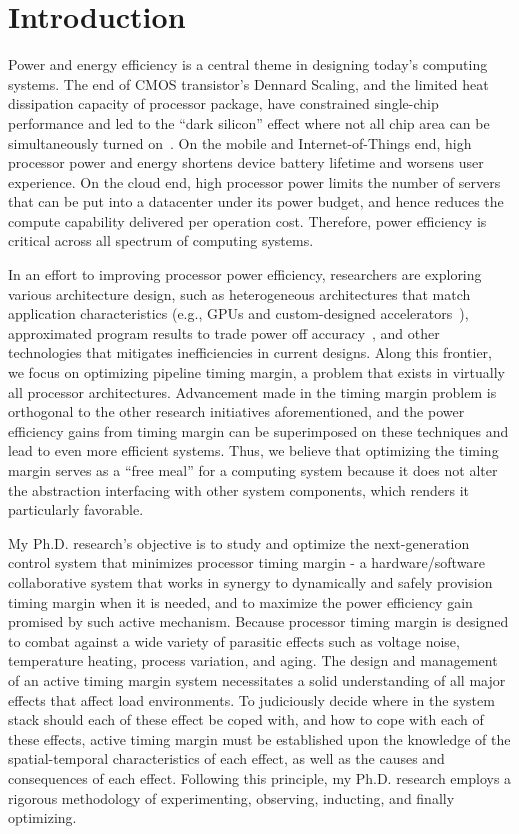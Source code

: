 
\section{Introduction}
\label{sec:intro}

Power and energy efficiency is a central theme in designing today's computing systems. The end of CMOS transistor's Dennard Scaling, and the limited heat dissipation capacity of processor package, have constrained single-chip performance and led to the ``dark silicon'' effect where not all chip area can be simultaneously turned on~\cite{esmaeilzadeh2011dark}. On the mobile and Internet-of-Things end, high processor power and energy shortens device battery lifetime and worsens user experience. On the cloud end, high processor power limits the number of servers that can be put into a datacenter under its power budget, and hence reduces the compute capability delivered per operation cost. Therefore, power efficiency is critical across all spectrum of computing systems. 

In an effort to improving processor power efficiency, researchers are exploring various architecture design, such as heterogeneous architectures that match application characteristics (e.g., GPUs and custom-designed accelerators~\cite{nickolls2010gpu, chen2014diannao}), approximated program results to trade power off accuracy~\cite{sampsonenerj}, and other technologies that mitigates inefficiencies in current designs. Along this frontier, we focus on optimizing pipeline timing margin, a problem that exists in virtually all processor architectures. Advancement made in the timing margin problem is orthogonal to the other research initiatives aforementioned, and the power efficiency gains from timing margin can be superimposed on these techniques and lead to even more efficient systems. Thus, we believe that optimizing the timing margin serves as a ``free meal'' for a computing system because it does not alter the abstraction interfacing with other system components, which renders it particularly favorable.

My Ph.D. research's objective is to study and optimize the next-generation control system that minimizes processor timing margin - a hardware/software collaborative system that works in synergy to dynamically and safely provision timing margin when it is needed, and to maximize the power efficiency gain promised by such active mechanism. Because processor timing margin is designed to combat against a wide variety of parasitic effects such as voltage noise, temperature heating, process variation, and aging. The design and management of an active timing margin system necessitates a solid understanding of all major effects that affect load environments. To judiciously decide where in the system stack should each of these effect be coped with, and how to cope with each of these effects, active timing margin must be established upon the knowledge of the spatial-temporal characteristics of each effect, as well as the causes and consequences of each effect. Following this principle, my Ph.D. research employs a rigorous methodology of experimenting, observing, inducting, and finally optimizing. 

